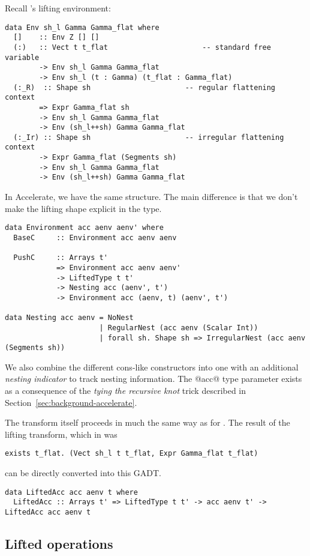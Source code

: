 Recall \ndp{}'s lifting environment:
%
\begin{lstlisting}[style=ndp]
data Env sh_l Gamma Gamma_flat where
  []    :: Env Z [] []
  (:)   :: Vect t t_flat                      -- standard free variable
        -> Env sh_l Gamma Gamma_flat
        -> Env sh_l (t : Gamma) (t_flat : Gamma_flat)
  (:_R)  :: Shape sh                      -- regular flattening context
        => Expr Gamma_flat sh
        -> Env sh_l Gamma Gamma_flat
        -> Env (sh_l++sh) Gamma Gamma_flat
  (:_Ir) :: Shape sh                      -- irregular flattening context
        -> Expr Gamma_flat (Segments sh)
        -> Env sh_l Gamma Gamma_flat
        -> Env (sh_l++sh) Gamma Gamma_flat
\end{lstlisting}
%
In Accelerate, we have the same structure. The main difference is that we don't make the lifting shape explicit in the type.
%
\begin{lstlisting}
data Environment acc aenv aenv' where
  BaseC     :: Environment acc aenv aenv

  PushC     :: Arrays t'
            => Environment acc aenv aenv'
            -> LiftedType t t'
            -> Nesting acc (aenv', t')
            -> Environment acc (aenv, t) (aenv', t')

data Nesting acc aenv = NoNest
                      | RegularNest (acc aenv (Scalar Int))
                      | forall sh. Shape sh => IrregularNest (acc aenv (Segments sh))
\end{lstlisting}
%
We also combine the different cons-like constructors into one with an additional \emph{nesting indicator} to track nesting information. The @acc@ type parameter exists as a consequence of the \emph{tying the recursive knot} trick described in Section~\ref{sec:background-accelerate}.

The transform itself proceeds in much the same way as for \ndp{}. The result of the lifting transform, which in \ndp{} was
%
\begin{lstlisting}[style=ndp]
exists t_flat. (Vect sh_l t t_flat, Expr Gamma_flat t_flat)
\end{lstlisting}
%
can be directly converted into this GADT.
%
\begin{lstlisting}
data LiftedAcc acc aenv t where
  LiftedAcc :: Arrays t' => LiftedType t t' -> acc aenv t' -> LiftedAcc acc aenv t
\end{lstlisting}
%

\subsection{Lifted operations}

